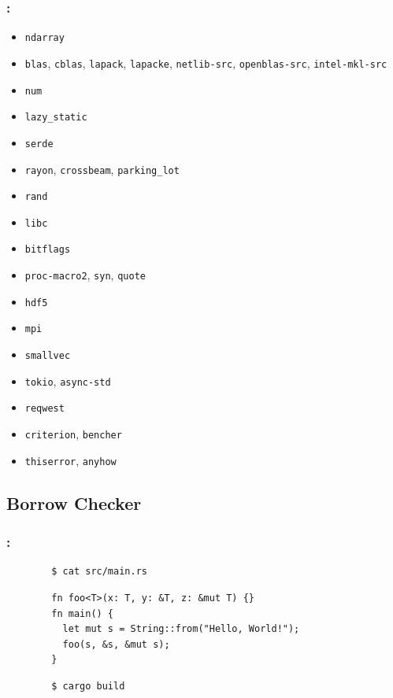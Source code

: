 \documentclass[aspectratio=43, t]{beamer}
\begin{document}
\begin{frame}
	\frametitle{\secname: \subsecname}

	\begin{multicols}{2}
		\begin{itemize}
			\item \texttt{ndarray}
			\item \texttt{blas}, \texttt{cblas}, \texttt{lapack}, \texttt{lapacke}, \texttt{netlib-src}, \texttt{openblas-src}, \texttt{intel-mkl-src}
			\item \texttt{num}
			\item \texttt{lazy\_static}
			\item \texttt{serde}
			\item \texttt{rayon}, \texttt{crossbeam}, \texttt{parking\_lot}
			\item \texttt{rand}
			\item \texttt{libc}
			\item \texttt{bitflags}
			\item \texttt{proc-macro2}, \texttt{syn}, \texttt{quote}
			\item \texttt{hdf5}
			\item \texttt{mpi}
			\item \texttt{smallvec}
			\item \texttt{tokio}, \texttt{async-std}
			\item \texttt{reqwest}
			\item \texttt{criterion}, \texttt{bencher}
			\item \texttt{thiserror}, \texttt{anyhow}
		\end{itemize}
	\end{multicols}
\end{frame}

\subsection*{Borrow Checker}
\begin{frame}[fragile]
	\frametitle{\secname: \subsecname}

	\begin{verbatim}
		$ cat src/main.rs
	\end{verbatim}
	\begin{verbatim}
		fn foo<T>(x: T, y: &T, z: &mut T) {}
		fn main() {
		  let mut s = String::from("Hello, World!");
		  foo(s, &s, &mut s);
		}
	\end{verbatim}
	\begin{verbatim}
		$ cargo build
	\end{verbatim}
\end{frame}
\end{document}
